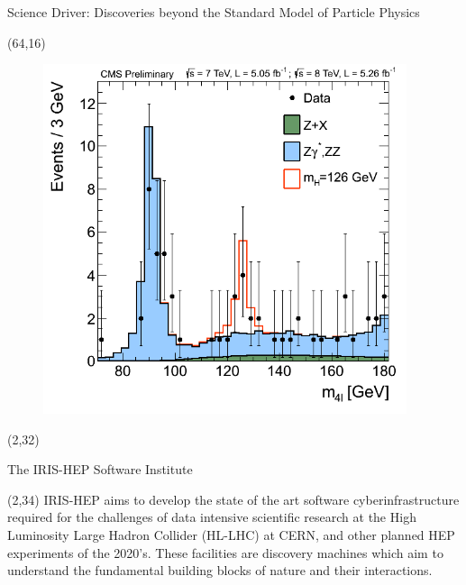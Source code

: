 \documentclass[final]{beamer}
\begin{document}
\begin{frame}{}
\begin{textblock}{80.0}
\begin{block}{Science Driver: Discoveries beyond the Standard Model of Particle Physics}
\begin{textblock}{16.0}(64,16)
\begin{figure}[H]
\includegraphics[width=0.95\textwidth]{images/Fig4-ZZMass_7Plus8TeV_70-180_3GeV.png}
\end{figure}
\end{textblock}

\end{block}
\end{textblock}



\begin{textblock}{20.0}(2,32)
\begin{block}{The IRIS-HEP Software Institute}
\begin{textblock}{20.0}(2,34)
IRIS-HEP aims to develop the state of the art software cyberinfrastructure required for the challenges of data intensive scientific research at the High Luminosity Large Hadron Collider (HL-LHC) at CERN, and other planned HEP experiments of the 2020’s. These facilities are discovery machines which aim to understand the fundamental building blocks of nature and their interactions.
\end{textblock}
\end{block}
\end{textblock}



\end{frame}
\end{document}
